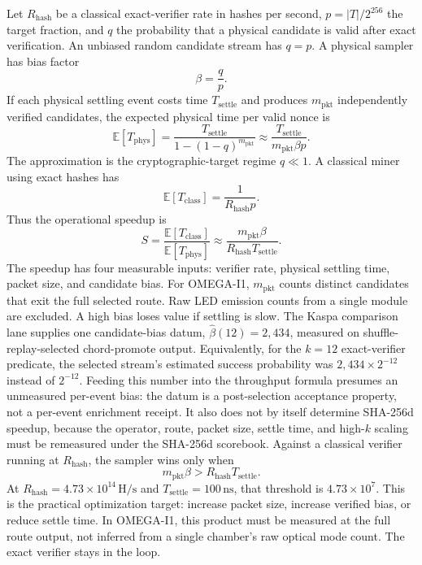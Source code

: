 \documentclass[11pt]{article}
\theoremstyle{definition}
\theoremstyle{remark}
\begin{document}
Let \(R_{\mathrm{hash}}\) be a classical exact-verifier rate in hashes per
second, \(p=|T|/2^{256}\) the target fraction, and \(q\) the probability that a
physical candidate is valid after exact verification. An unbiased random
candidate stream has \(q=p\). A physical sampler has bias factor
\[
\beta=\frac{q}{p}.
\]
If each physical settling event costs time \(T_{\mathrm{settle}}\) and produces
\(m_{\mathrm{pkt}}\) independently verified candidates, the expected physical
time per valid nonce is
\[
\mathbb E[T_{\mathrm{phys}}]
=\frac{T_{\mathrm{settle}}}{1-(1-q)^{m_{\mathrm{pkt}}}}
\approx\frac{T_{\mathrm{settle}}}{m_{\mathrm{pkt}}\beta p}.
\]
The approximation is the cryptographic-target regime \(q\ll1\).
A classical miner using exact hashes has
\[
\mathbb E[T_{\mathrm{class}}]=\frac{1}{R_{\mathrm{hash}}p}.
\]
Thus the operational speedup is
\[
S=\frac{\mathbb E[T_{\mathrm{class}}]}{\mathbb E[T_{\mathrm{phys}}]}
\approx\frac{m_{\mathrm{pkt}}\beta}{R_{\mathrm{hash}}T_{\mathrm{settle}}}.
\]
The speedup has four measurable inputs: verifier rate, physical settling time,
packet size, and candidate bias. For OMEGA-I1, \(m_{\mathrm{pkt}}\) counts
distinct candidates that exit the full selected route. Raw LED emission counts
from a single module are excluded. A high bias loses value if settling is slow.
The Kaspa comparison lane supplies one candidate-bias datum,
\(\widehat\beta(12)=2{,}434\), measured on shuffle-replay-selected
chord-promote output. Equivalently, for the \(k=12\) exact-verifier predicate,
the selected stream's estimated success probability was \(2{,}434\times2^{-12}\)
instead of \(2^{-12}\). Feeding this number into the throughput formula
presumes an unmeasured per-event bias: the datum is a post-selection
acceptance property, not a per-event enrichment receipt. It also does not by itself determine SHA-256d speedup,
because the operator, route, packet size, settle time, and high-\(k\) scaling
must be remeasured under the SHA-256d scorebook.
Against a classical verifier running at \(R_{\mathrm{hash}}\), the sampler wins
only when
\[
m_{\mathrm{pkt}}\beta>R_{\mathrm{hash}}T_{\mathrm{settle}}.
\]
At \(R_{\mathrm{hash}}=4.73\times10^{14}\,\mathrm{H/s}\) and
\(T_{\mathrm{settle}}=100\,\mathrm{ns}\), that threshold is
\(4.73\times10^7\). This is the practical optimization target: increase packet
size, increase verified bias, or reduce settle time. In OMEGA-I1, this product
must be measured at the full route output, not inferred from a single chamber's
raw optical mode count. The exact verifier stays in the loop.
\end{document}
